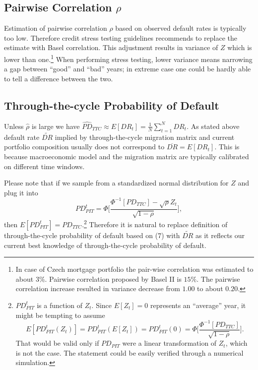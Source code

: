 \documentclass[a4paper]{article}
\begin{document}
\subsection{Pairwise Correlation $\rho$}

Estimation of pairwise correlation $\rho$ based on observed default rates is typically too low. Therefore credit stress testing guidelines recommends to replace the estimate with Basel correlation. This adjustment results in variance of $Z$ which is lower than one.\footnote{In case of Czech mortgage portfolio the pair-wise correlation was estimated to about $3\%$. Pairwise correlation proposed by Basel II is $15\%$. The pairwise correlation increase resulted in variance decrease from $1.00$ to about $0.20$.} When performing stress testing, lower variance means narrowing a gap between ``good'' and ``bad'' years; in extreme case one could be hardly able to tell a difference between the two.

\subsection{Through-the-cycle Probability of Default}

Unless $\hat{\rho}$ is large we have $\widehat{PD}_{TTC} \approx E[DR_t] = \frac{1}{N}\sum_{t = 1}^N DR_t$. As stated above default rate $\widetilde{DR}$ implied by through-the-cycle migration matrix and current portfolio composition usually does not correspond to $\overline{DR} = E[DR_t]$. This is because macroeconomic model and the migration matrix are typically calibrated on different time windows.

Please note that if we sample from a standardized normal distribution for $Z$ and plug it into
\begin{equation}
PD_{PIT}^t = \Phi\Big[\frac{\Phi^{-1}[PD_{TTC}] - \sqrt{\rho}Z_t}{\sqrt{1-\rho}}\Big],
\end{equation}
then $E[PD_{PIT}^t] = PD_{TTC}$.\footnote{$PD_{PIT}^t$ is a function of $Z_t$. Since $E[Z_t] = 0$ represents an ``average'' year, it might be tempting to assume
\begin{equation*}
E[PD_{PIT}^t(Z_t)] = PD_{PIT}^t(E[Z_t]) = PD_{PIT}^t(0) = \Phi\Big[\frac{\Phi^{-1}[PD_{TTC}]}{\sqrt{1-\rho}}\Big].
\end{equation*}
That would be valid only if $PD_{PIT}$ were a linear transformation of $Z_t$, which is not the case. The statement could be easily verified through a numerical simulation.} Therefore it is natural to replace definition of through-the-cycle probability of default based on (7) with $\widetilde{DR}$ as it reflects our current best knowledge of through-the-cycle probability of default.
\end{document}
